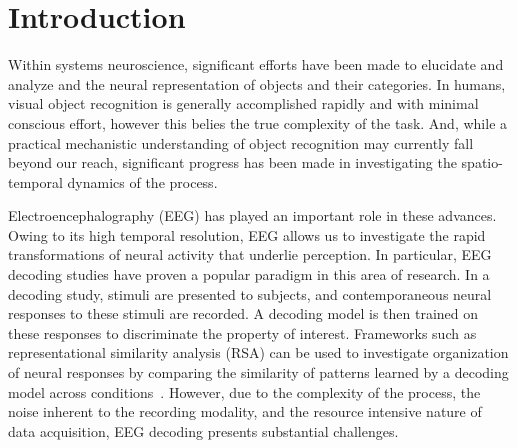 
\section{Introduction}
Within systems neuroscience, significant efforts have been made to elucidate and analyze and the neural representation of objects and their categories. In humans, visual object recognition is generally accomplished rapidly and with minimal conscious effort, however this belies the true complexity of the task. And, while a practical mechanistic understanding of object recognition may currently fall beyond our reach, significant progress has been made in investigating the spatio-temporal dynamics of the process. 

Electroencephalography (EEG) has played an important role in these advances. Owing to its high temporal resolution, EEG allows us to investigate the rapid transformations of neural activity that underlie perception. In particular, EEG decoding studies have proven a popular paradigm in this area of research. In a decoding study, stimuli are presented to subjects, and contemporaneous neural responses to these stimuli are recorded. A decoding model is then trained on these responses to discriminate the property of interest. Frameworks such as representational similarity analysis (RSA) can be used to investigate organization of neural responses by comparing the similarity of patterns learned by a decoding model across conditions~\cite{Kriegeskorte:2008}. However, due to the complexity of the process, the noise inherent to the recording modality, and the resource intensive nature of data acquisition, EEG decoding presents substantial challenges.  

